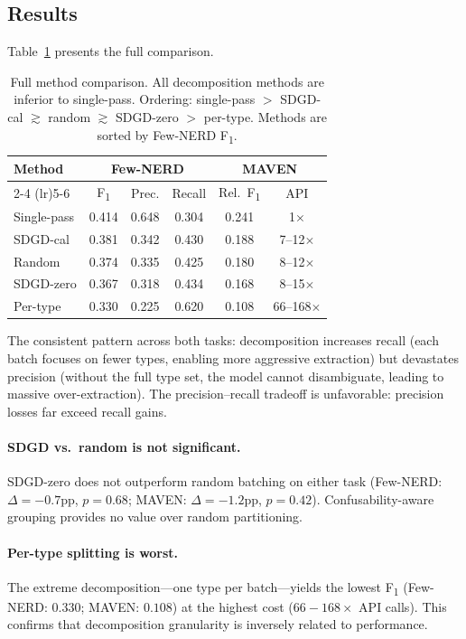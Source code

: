 \documentclass[11pt,a4paper]{article}
\newcommand{\fone}{F\textsubscript{1}}
\begin{document}
\subsection{Results}

Table~\ref{tab:sdgd_main} presents the full comparison.

\begin{table}[t]
\centering
\caption{Full method comparison. All decomposition methods are inferior to single-pass. Ordering: single-pass $>$ SDGD-cal $\gtrsim$ random $\gtrsim$ SDGD-zero $>$ per-type. Methods are sorted by Few-NERD \fone{}.}
\label{tab:sdgd_main}
\small
\begin{tabular}{lccccc}
\toprule
\textbf{Method} & \multicolumn{3}{c}{\textbf{Few-NERD}} & \multicolumn{2}{c}{\textbf{MAVEN}} \\
\cmidrule(lr){2-4} \cmidrule(lr){5-6}
 & \fone{} & Prec. & Recall & Rel.\ \fone{} & API \\
\midrule
Single-pass & 0.414 & 0.648 & 0.304 & 0.241 & 1$\times$ \\
SDGD-cal    & 0.381 & 0.342 & 0.430 & 0.188 & 7--12$\times$ \\
Random      & 0.374 & 0.335 & 0.425 & 0.180 & 8--12$\times$ \\
SDGD-zero   & 0.367 & 0.318 & 0.434 & 0.168 & 8--15$\times$ \\
Per-type    & 0.330 & 0.225 & 0.620 & 0.108 & 66--168$\times$ \\
\bottomrule
\end{tabular}
\end{table}

The consistent pattern across both tasks: decomposition increases recall (each batch focuses on fewer types, enabling more aggressive extraction) but devastates precision (without the full type set, the model cannot disambiguate, leading to massive over-extraction).
The precision--recall tradeoff is unfavorable: precision losses far exceed recall gains.

\paragraph{SDGD vs.\ random is not significant.}
SDGD-zero does not outperform random batching on either task (Few-NERD: $\Delta{=}{-}0.7$pp, $p{=}0.68$; MAVEN: $\Delta{=}{-}1.2$pp, $p{=}0.42$).
Confusability-aware grouping provides no value over random partitioning.

\paragraph{Per-type splitting is worst.}
The extreme decomposition---one type per batch---yields the lowest \fone{} (Few-NERD: $0.330$; MAVEN: $0.108$) at the highest cost ($66{-}168{\times}$ API calls).
This confirms that decomposition granularity is inversely related to performance.
\end{document}
